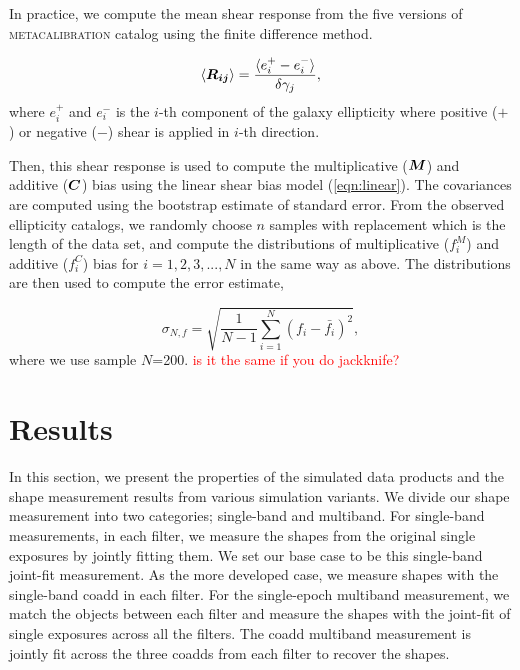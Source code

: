 \documentclass[fleqn,usenatbib]{mnras}
\begin{document}
In practice, we compute the mean shear response from the five versions of \textsc{metacalibration} catalog using the finite difference method. 

\begin{equation}
    \langle\vb*{R_{ij}}\rangle = 
    \frac{\langle e^{+}_{i} - e^{-}_{i} \rangle}{\delta\gamma_{j}}, 
\end{equation}
where $e^{+}_{i}$ and $e^{-}_{i}$ is the $i$-th component of the galaxy ellipticity where positive ($+$) or negative ($-$) shear is applied in $i$-th direction. 


Then, this shear response is used to compute the multiplicative ($\vb*{M}$) and additive ($\vb*{C}$) bias using the linear shear bias model (\ref{eqn:linear}). The covariances are computed using the bootstrap estimate of standard error. From the observed ellipticity catalogs, we randomly choose $n$ samples with replacement which is the length of the data set, and compute the distributions of multiplicative ($f^{M}_{i}$) and additive ($f^{C}_{i}$) bias for $i=1,2,3,...,N$ in the same way as above. The distributions are then used to compute the error estimate,  


\begin{equation}
    \sigma_{N,f} = \sqrt{\frac{1}{N-1} \sum_{i=1}^{N}(f_{i}-\bar{f_{i}})^{2}}, 
\end{equation}
where we use sample $N$=200.  \textcolor{red}{is it the same if you do jackknife?}


\section{Results}
\label{sec:results}
In this section, we present the properties of the simulated data products and the shape measurement results from various simulation variants. We divide our shape measurement into two categories; single-band and multiband. For single-band measurements, in each filter, we measure the shapes from the original single exposures by jointly fitting them. We set our base case to be this single-band joint-fit measurement. As the more developed case, we measure shapes with the single-band coadd in each filter. For the single-epoch multiband measurement, we match the objects between each filter and measure the shapes with the joint-fit of single exposures across all the filters. The coadd multiband measurement is jointly fit across the three coadds from each filter to recover the shapes. 
\end{document}
